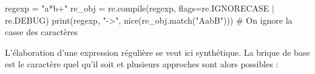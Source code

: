 \begin{idleconsole*}
	\begin{pyconsole}
regexp = "a*b+"
re_obj = re.compile(regexp, flags=re.IGNORECASE | re.DEBUG)
print(regexp, "->", nice(re_obj.match("AabB"))) # On ignore la casse des caractères
	\end{pyconsole}
\end{idleconsole*}

\vspace{1pt}


L'élaboration d'une expression régulière se veut ici synthétique.
La brique de base est le caractère quel qu'il soit et plusieurs approches sont alors possibles :
